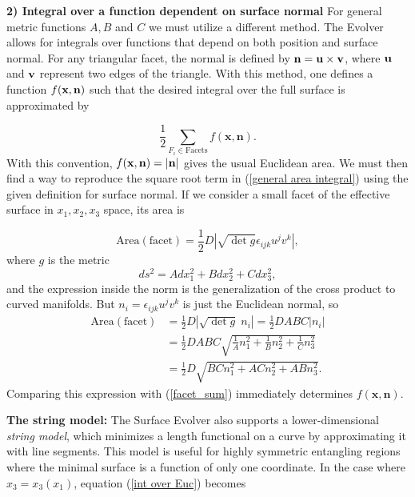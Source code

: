 \documentclass[11 pt]{article}
\begin{document}
\textbf{2) Integral over a function dependent on surface normal}
For general metric functions $A, B$ and $C$ we must utilize a different method. The Evolver allows for integrals over functions that depend on both position and surface normal. For any triangular facet, the normal is defined by $\bf{n}=\bf{u}\times\bf{v}$, where $\bf{u}$ and $\bf{v}$ represent two edges of the triangle. With this method, one defines a function $f(\bf{x},\bf{n})$ such that the desired integral over the full surface is approximated by

\begin{equation} \label{facet_sum}
    \frac{1}{2}\sum_{F_i\in \text{Facets}} f(\mathbf{x},\mathbf{n}).
\end{equation}
With this convention, $f(\bf{x},\bf{n}) = |\bf{n}|$ gives the usual Euclidean area. We must then find a way to reproduce the square root term in (\ref{general area integral}) using the given definition for surface normal.
If we consider a small facet of the effective surface in $x_1,x_2,x_3$ space, its area is

\begin{equation}
    \text{Area}(\text{facet}) =\frac{1}{2} D \left|\sqrt{\det g}\epsilon_{ijk} u^j v^k\right|,
\end{equation}
where $g$ is the metric
\begin{equation}
    ds^2 = Adx_1^2 + Bdx_2^2 + Cdx_3^2,
\end{equation}
and the expression inside the norm is the generalization of the cross product to curved manifolds. But $n_i = \epsilon_{ijk} u^j v^k$ is just the Euclidean normal, so
\begin{align} \label{int surface normal}
    \text{Area}(\text{facet}) &= \frac{1}{2} D \left|\sqrt{\det g}\;n_i\right| = \frac{1}{2} D ABC\left|n_i\right| \nonumber\\
     &= \frac{1}{2} D ABC\sqrt{\frac{1}{A}n_1^2+\frac{1}{B}n_2^2+\frac{1}{C}n_3^2} \\
     &= \frac{1}{2} D \sqrt{BCn_1^2+ACn_2^2+ABn_3^2} \nonumber.
\end{align}
Comparing this expression with (\ref{facet_sum}) immediately determines $f(\mathbf{x},\mathbf{n})$.

\bigskip
{\bf The string model:}
The Surface Evolver also supports a lower-dimensional \textit{string model}, which minimizes a length functional on a curve by approximating it with line segments. This model is useful for highly symmetric entangling regions where the minimal surface is a function of only one coordinate. In the case where $x_3 = x_3(x_1)$, equation (\ref{int over Euc}) becomes 
\end{document}
